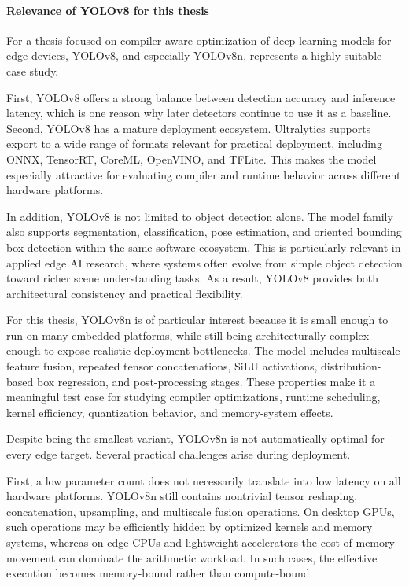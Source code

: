 \documentclass[12pt,a4paper]{report}
\begin{document}
\paragraph{Relevance of YOLOv8 for this thesis}

For a thesis focused on compiler-aware optimization of deep learning models for edge devices, YOLOv8, and especially
YOLOv8n, represents a highly suitable case study.

First, YOLOv8 offers a strong balance between detection accuracy and inference latency, which is one reason why
later detectors continue to use it as a baseline. Second, YOLOv8 has a mature deployment ecosystem. Ultralytics
supports export to a wide range of formats relevant for practical deployment, including ONNX, TensorRT, CoreML,
OpenVINO, and TFLite. This makes the model especially attractive for evaluating compiler and runtime behavior across
different hardware platforms.

In addition, YOLOv8 is not limited to object detection alone. The model family also supports segmentation,
classification, pose estimation, and oriented bounding box detection within the same software ecosystem.
This is particularly relevant in applied edge AI research, where systems often evolve from simple object
detection toward richer scene understanding tasks. As a result, YOLOv8 provides both architectural consistency
and practical flexibility.

For this thesis, YOLOv8n is of particular interest because it is small enough to run on many embedded platforms,
while still being architecturally complex enough to expose realistic deployment bottlenecks. The model includes
multiscale feature fusion, repeated tensor concatenations, SiLU activations, distribution-based box regression,
and post-processing stages. These properties make it a meaningful test case for studying compiler optimizations,
runtime scheduling, kernel efficiency, quantization behavior, and memory-system effects.

Despite being the smallest variant, YOLOv8n is not automatically optimal for every edge target. Several practical
challenges arise during deployment.

First, a low parameter count does not necessarily translate into low latency on all hardware platforms. YOLOv8n still
contains nontrivial tensor reshaping, concatenation, upsampling, and multiscale fusion operations. On desktop GPUs,
such operations may be efficiently hidden by optimized kernels and memory systems, whereas on edge CPUs and lightweight
accelerators the cost of memory movement can dominate the arithmetic workload. In such cases, the effective
execution becomes memory-bound rather than compute-bound.
\end{document}
